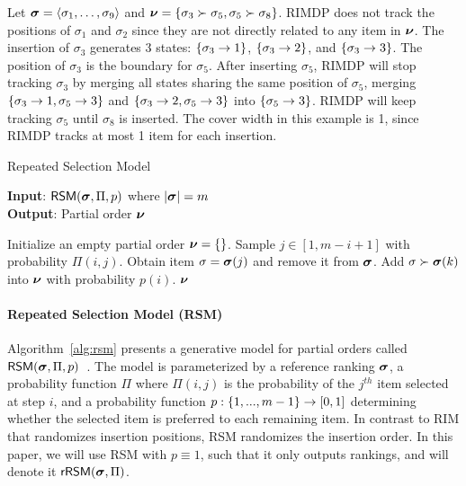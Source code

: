 \begin{example}
    Let $\bsigma=\angs{\enum[9]{\sigma}}$ and $\partialOrder=\set{\sigma_3 \succ \sigma_5, \sigma_5 \succ \sigma_8}$.
    RIMDP does not track the positions of $\sigma_1$ and $\sigma_2$ since they are not directly related to any item in $\partialOrder$.
    The insertion of $\sigma_3$ generates 3 states: $\set{\sigma_3 \rightarrow 1}$, $\set{\sigma_3 \rightarrow 2}$, and $\set{\sigma_3 \rightarrow 3}$.
    The position of $\sigma_3$ is the boundary for $\sigma_5$.
    After inserting $\sigma_5$, RIMDP will stop tracking $\sigma_3$ by merging all states sharing the same position of $\sigma_5$, \eg merging $\set{\sigma_3 \rightarrow 1, \sigma_5 \rightarrow 3}$ and $\set{\sigma_3 \rightarrow 2, \sigma_5 \rightarrow 3}$ into $\set{\sigma_5 \rightarrow 3}$.
    RIMDP will keep tracking $\sigma_5$ until $\sigma_8$ is inserted.
    The cover width in this example is 1, since RIMDP tracks at most 1 item for each insertion.
\end{example}

\begin{algorithm}[b!]
	\small 
	\raggedright
	\caption{Repeated Selection Model}
	\label{alg:rsm}
	\textbf{Input}: $\mathsf{RSM}(\bsigma, \Pi, p)$ where $|\bsigma|=m$ \\
	\textbf{Output}:  Partial order $\partialOrder$
	\begin{algorithmic}[1]
		\STATE Initialize an empty partial order $\partialOrder = \set{}$.
		\STATE Sample $j \in [1, m-i+1]$ with probability $\Pi(i, j)$.
		\STATE Obtain item $\sigma = \bsigma(j)$ and remove it from $\bsigma$.
		\STATE Add $\sigma \succ \bsigma(k)$ into $\partialOrder$ with probability $p(i)$.
		\ENDFOR
		\ENDFOR
		\RETURN  $\partialOrder$
	\end{algorithmic}
\end{algorithm}

\paragraph{Repeated Selection Model (RSM)}

Algorithm~\ref{alg:rsm} presents a generative model for partial orders called $\mathsf{RSM}(\bsigma, \Pi, p)$~\cite{DBLP:journals/tdasci/ChakrabortyDKKR21}.
The model is parameterized by a reference ranking $\bsigma$, a probability function $\Pi$ where $\Pi(i, j)$ is the probability of the $j^{th}$ item selected at step $i$, and a probability function $p:\set{1,...,m-1} \rightarrow [0,1]$ determining whether the selected item is preferred to each remaining item.
In contrast to RIM that randomizes insertion positions, RSM randomizes the insertion order.
%
In this paper, we will use RSM with $p \equiv 1$, such that it only outputs rankings, and will denote it  $\RSM(\bsigma, \Pi)$.


